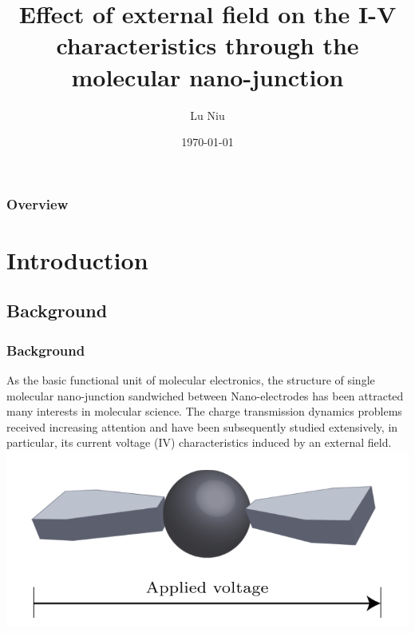 \documentclass{beamer}
\title[Short title]{Effect of external field on the I-V characteristics through the molecular nano-junction} %
\author{Lu Niu} %
\institute[USYD] %
{
The University of Sydney \\ %
\medskip
\textit{luke.niu@sydney.edu.au} %
}
\date{\today} %
\begin{document}
\begin{frame}
\titlepage %
\end{frame}

\begin{frame}
\frametitle{Overview} %
\tableofcontents %
\end{frame}



\section{Introduction} %

    \subsection{Background}

\begin{frame}
\frametitle{Background}
As the basic functional unit of molecular electronics, the structure of single molecular nano-junction sandwiched between Nano-electrodes has been attracted many interests in molecular science. The charge transmission dynamics problems received increasing attention and have been subsequently studied extensively, in particular, its current voltage (IV) characteristics induced by an external field.
\includegraphics[scale=0.4]{NanoJunction.png}
\end{frame}
\end{document}
